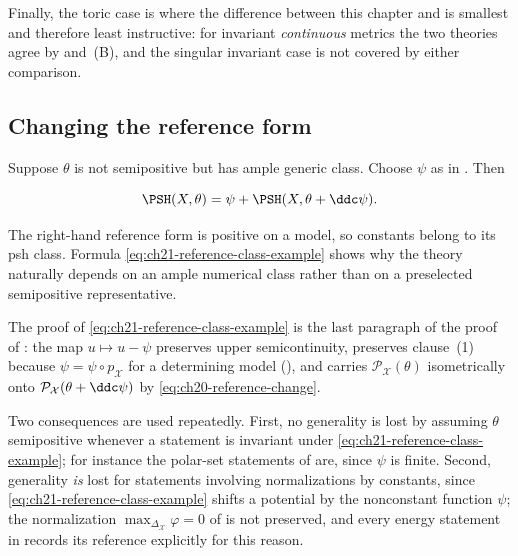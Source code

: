 \begin{example}
Finally, the toric case is where the difference between this chapter and
 is smallest and therefore least instructive: for invariant
\emph{continuous} metrics the two theories agree by
 and
\,(B), and the singular invariant case is
not covered by either comparison.
\end{example}

\subsection{Changing the reference form}
\label{sec:ch21-worked-reference}

\begin{example}
\label{ex:ch21-reference-class}
Suppose \(\theta\) is not semipositive but has ample generic class.  Choose
\(\psi\) as in .  Then

\begin{equation}
\label{eq:ch21-reference-class-example}
 \PSH(X,\theta)
   =\psi+\PSH(X,\theta+\ddc\psi).
\end{equation}

The right-hand reference form is positive on a model, so constants belong
to its psh class.  Formula \eqref{eq:ch21-reference-class-example} shows why
the theory naturally depends on an ample numerical class rather than on a
preselected semipositive representative.

The proof of \eqref{eq:ch21-reference-class-example} is the last paragraph
of the proof of : the map
\(u\mapsto u-\psi\) preserves upper semicontinuity, preserves clause~(1)
because \(\psi=\psi\circ p_{\mathcal X}\) for a determining model
(), and carries
\(\mathcal P_{\mathcal X}(\theta)\) isometrically onto
\(\mathcal P_{\mathcal X}(\theta+\ddc\psi)\) by
\eqref{eq:ch20-reference-change}.

Two consequences are used repeatedly.  First, no generality is lost by
assuming \(\theta\) semipositive whenever a statement is invariant under
\eqref{eq:ch21-reference-class-example}; for instance the polar-set
statements of  are, since \(\psi\) is
finite.  Second, generality \emph{is} lost for statements involving
normalizations by constants, since
\eqref{eq:ch21-reference-class-example} shifts a potential by the nonconstant
function \(\psi\); the normalization
\(\max_{\Delta_{\mathcal X}}\varphi=0\) of  is
not preserved, and every energy statement in
 records its reference explicitly for this reason.
\end{example}

